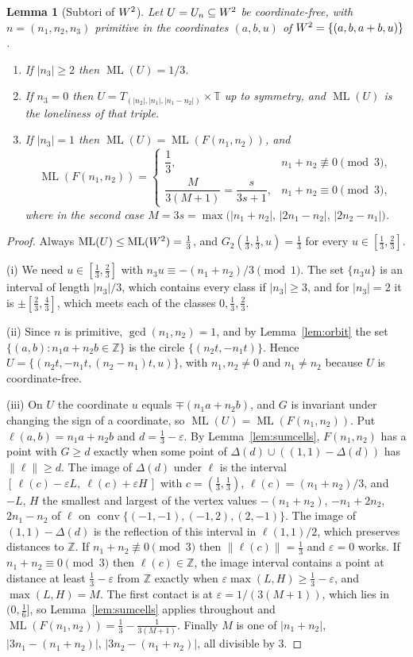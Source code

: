 \documentclass[12pt]{amsart}
\newtheorem{lemma}[theorem]{Lemma}
\theoremstyle{definition}\newtheorem{definition}[theorem]{Definition}
\theoremstyle{remark}\newtheorem{remark}[theorem]{Remark}
\newcommand{\Z}{\mathbb Z}\newcommand{\R}{\mathbb R}\newcommand{\T}{\mathbb T}
\newcommand{\norm}[1]{\lVert #1\rVert}
\newcommand{\ML}{\operatorname{ML}}
\begin{document}
\begin{lemma}[Subtori of $W^{2}$]\label{lem:W2sub}
Let $U=U_n\subseteq W^{2}$ be coordinate-free, with $n=(n_1,n_2,n_3)$ primitive in the coordinates $(a,b,u)$ of $W^{2}=\{(a,b,a+b,u)\}$.
\begin{enumerate}[label=\textup{(\roman*)},leftmargin=*]
\item If $|n_3|\ge2$ then $\ML(U)=1/3$.
\item If $n_3=0$ then $U=T_{(|n_2|,|n_1|,|n_1-n_2|)}\times\T$ up to symmetry, and $\ML(U)$ is the loneliness of that triple.
\item If $|n_3|=1$ then $\ML(U)=\ML(F(n_1,n_2))$, and
\[
 \ML(F(n_1,n_2))=\begin{cases}\dfrac13,&n_1+n_2\not\equiv0\pmod3,\\[8pt]\dfrac{M}{3(M+1)}=\dfrac{s}{3s+1},&n_1+n_2\equiv0\pmod 3,\end{cases}
\]
where in the second case $M=3s=\max\bigl(|n_1+n_2|,\,|2n_1-n_2|,\,|2n_2-n_1|\bigr)$.
\end{enumerate}
\end{lemma}
\begin{proof}
Always $\ML(U)\le\ML(\Wtwo)=\frac13$, and $G_2(\frac13,\frac13,u)=\frac13$ for every $u\in[\frac13,\frac23]$.

(i) We need $u\in[\frac13,\frac23]$ with $n_3u\equiv-(n_1+n_2)/3\pmod1$. The set $\{n_3u\}$ is an interval of length $|n_3|/3$, which contains every class if $|n_3|\ge3$, and for $|n_3|=2$ it is $\pm[\frac23,\frac43]$, which meets each of the classes $0,\frac13,\frac23$.

(ii) Since $n$ is primitive, $\gcd(n_1,n_2)=1$, and by Lemma~\ref{lem:orbit} the set $\{(a,b):n_1a+n_2b\in\Z\}$ is the circle $\{(n_2t,-n_1t)\}$. Hence $U=\{(n_2t,-n_1t,(n_2-n_1)t,u)\}$, with $n_1,n_2\ne0$ and $n_1\ne n_2$ because $U$ is coordinate-free.

(iii) On $U$ the coordinate $u$ equals $\mp(n_1a+n_2b)$, and $G$ is invariant under changing the sign of a coordinate, so $\ML(U)=\ML(F(n_1,n_2))$. Put $\ell(a,b)=n_1a+n_2b$ and $d=\frac13-\varepsilon$. By Lemma~\ref{lem:sumcells}, $F(n_1,n_2)$ has a point with $G\ge d$ exactly when some point of $\Delta(d)\cup((1,1)-\Delta(d))$ has $\norm{\ell}\ge d$. The image of $\Delta(d)$ under $\ell$ is the interval $[\,\ell(c)-\varepsilon L,\ \ell(c)+\varepsilon H\,]$ with $c=(\frac13,\frac13)$, $\ell(c)=(n_1+n_2)/3$, and $-L$, $H$ the smallest and largest of the vertex values $-(n_1+n_2)$, $-n_1+2n_2$, $2n_1-n_2$ of $\ell$ on $\operatorname{conv}\{(-1,-1),(-1,2),(2,-1)\}$. The image of $(1,1)-\Delta(d)$ is the reflection of this interval in $\ell(1,1)/2$, which preserves distances to $\Z$. If $n_1+n_2\not\equiv0\pmod 3$ then $\norm{\ell(c)}=\frac13$ and $\varepsilon=0$ works. If $n_1+n_2\equiv0\pmod3$ then $\ell(c)\in\Z$, the image interval contains a point at distance at least $\frac13-\varepsilon$ from $\Z$ exactly when $\varepsilon\max(L,H)\ge\frac13-\varepsilon$, and $\max(L,H)=M$. The first contact is at $\varepsilon=1/(3(M+1))$, which lies in $(0,\frac16]$, so Lemma~\ref{lem:sumcells} applies throughout and $\ML(F(n_1,n_2))=\frac13-\frac1{3(M+1)}$. Finally $M$ is one of $|n_1+n_2|$, $|3n_1-(n_1+n_2)|$, $|3n_2-(n_1+n_2)|$, all divisible by $3$.
\end{proof}
\end{document}
